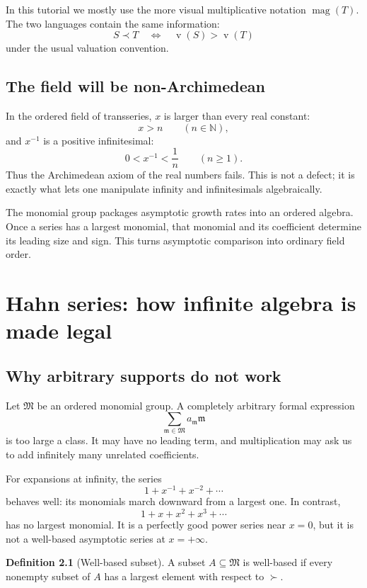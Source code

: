 \documentclass[11pt,oneside]{book}
\theoremstyle{definition}
\newtheorem{definition}[theorem]{Definition}
\theoremstyle{remark}
\newcommand{\N}{\mathbb{N}}
\newcommand{\M}{\mathfrak{M}}
\newcommand{\m}{\mathfrak{m}}
\newcommand{\magop}{\operatorname{mag}}
\newcommand{\val}{\operatorname{v}}
\newcommand{\precdom}{\prec}
\newcommand{\succdom}{\succ}
\begin{document}
In this tutorial we mostly use the more visual multiplicative notation
$\magop(T)$. The two languages contain the same information:
\[
  S\precdom T
  \quad\Longleftrightarrow\quad
  \val(S)>\val(T)
\]
under the usual valuation convention.

\section{The field will be non-Archimedean}

In the ordered field of transseries, $x$ is larger than every real constant:
\[
  x>n\qquad(n\in\N),
\]
and $x^{-1}$ is a positive infinitesimal:
\[
  0<x^{-1}<\frac1n\qquad(n\ge1).
\]
Thus the Archimedean axiom of the real numbers fails. This is not a defect; it is
exactly what lets one manipulate infinity and infinitesimals algebraically.

\begin{summarybox}
The monomial group packages asymptotic growth rates into an ordered algebra.
Once a series has a largest monomial, that monomial and its coefficient determine
its leading size and sign. This turns asymptotic comparison into ordinary field
order.
\end{summarybox}

\chapter{Hahn series: how infinite algebra is made legal}
\label{ch:hahn}

\section{Why arbitrary supports do not work}

Let $\M$ be an ordered monomial group. A completely arbitrary formal expression
\[
  \sum_{\m\in\M}a_{\m}\m
\]
is too large a class. It may have no leading term, and multiplication may ask us
to add infinitely many unrelated coefficients.

For expansions at infinity, the series
\[
  1+x^{-1}+x^{-2}+\cdots
\]
behaves well: its monomials march downward from a largest one. In contrast,
\[
  1+x+x^2+x^3+\cdots
\]
has no largest monomial. It is a perfectly good power series near $x=0$, but it
is not a well-based asymptotic series at $x=+\infty$.

\begin{definition}[Well-based subset]
A subset $A\subseteq\M$ is well-based if every nonempty subset of $A$ has a
largest element with respect to $\succdom$.
\end{definition}
\end{document}
